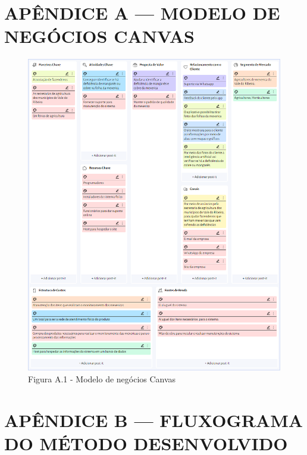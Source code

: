 
\begin{Appendix}

    \section{APÊNDICE A — MODELO DE NEGÓCIOS CANVAS}%
    \label{sect:apx-a1}
    
    \begin{figure}[H]
    \centering
    \caption{Figura A.1 -  Modelo de negócios Canvas}%
    \label{fig:canvaspi}
    \includegraphics[width=0.8\linewidth]{Illustrations/canvas.png}
    \end{figure}

    \section{APÊNDICE B — FLUXOGRAMA  DO MÉTODO DESENVOLVIDO}%
    \label{sect:apx-b1}


\end{Appendix}
